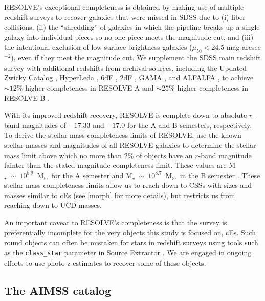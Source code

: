 \documentclass[iop,apj]{emulateapj}
\newcommand{\Msun}{M$_{\odot}$}
\begin{document}
RESOLVE's exceptional completeness is obtained by making use of multiple redshift surveys to recover galaxies that were missed in SDSS due to (i) fiber collisions, (ii) the ``shredding'' of galaxies in which the pipeline breaks up a single galaxy into individual pieces so no one piece meets the magnitude cut, and (iii) the intentional exclusion of low surface brightness galaxies ($\mu_{50} < 24.5$ mag arcsec$^{-2}$), even if they meet the magnitude cut. We supplement the SDSS main redshift survey with additional redshifts from archival sources, including the Updated Zwicky Catalog \citep{Falco1999}, HyperLeda \citep{Paturel2003}, 6dF \citep{Jones2009}, 2dF \citep{Colless2001}, GAMA \citep{Driver2011}, and ALFALFA \citep{Haynes2011}, to achieve $\sim12\%$ higher completeness in RESOLVE-A and $\sim25\%$ higher completeness in RESOLVE-B \citep{Eckert2015}.

With its improved redshift recovery, RESOLVE is complete down to absolute $r$-band magnitudes of $-17.33$ and $-17.0$ for the A and B semesters, respectively. To derive the stellar mass completeness limits of RESOLVE, \citet{Eckert2016} use the known stellar masses and magnitudes of all RESOLVE galaxies to determine the stellar mass limit above which no more than 2\% of objects have an $r$-band magnitude fainter than the stated magnitude completeness limit. These values are M$_{\star}~\sim~10^{8.9}$~\Msun~for the A semester and M$_{\star}~\sim~10^{8.7}$~\Msun~in the B semester \citep[Figure 8 in ][]{Eckert2016}. These stellar mass completeness limits allow us to reach down to CSSs with sizes and masses similar to cEs (see \autoref{morph} for more details), but restricts us from reaching down to UCD masses.

An important caveat to RESOLVE's completeness is that the survey is preferentially incomplete for the very objects this study is focused on, cEs. Such round objects can often be mistaken for stars in redshift surveys using tools such as the \texttt{class\_star} parameter in Source Extractor \citep{Bertin1996}. We are engaged in ongoing efforts to use photo-z estimates to recover some of these objects.

\subsection{The AIMSS catalog}
\label{aimss}
\end{document}
